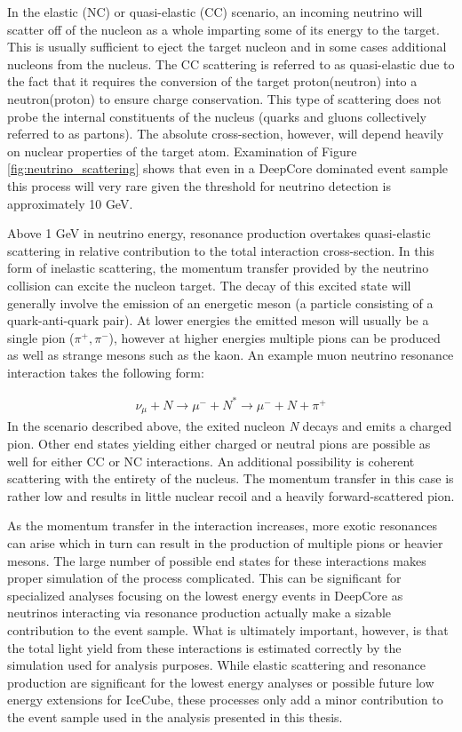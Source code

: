\documentclass{gatech-thesis}
\begin{document}
In the elastic (NC) or quasi-elastic (CC) scenario, an incoming neutrino will scatter off of the nucleon as a whole imparting some of its energy to the target. This is usually sufficient to eject the target nucleon and in some cases additional nucleons from the nucleus. The CC scattering is referred to as quasi-elastic due to the fact that it requires the conversion of the target proton(neutron) into a neutron(proton) to ensure charge conservation. This type of scattering does not probe the internal constituents of the nucleus (quarks and gluons collectively referred to as partons). The absolute cross-section, however, will depend heavily on nuclear properties of the target atom. Examination of Figure \ref{fig:neutrino_scattering} shows that even in a DeepCore dominated event sample this process will very rare given the threshold for neutrino detection is approximately 10 GeV.

Above 1 GeV in neutrino energy, resonance production overtakes quasi-elastic scattering in relative contribution to the total interaction cross-section. In this form of inelastic scattering, the momentum transfer provided by the neutrino collision can excite the nucleon target. The decay of this excited state will generally involve the emission of an energetic meson (a particle consisting of a quark-anti-quark pair). At lower energies the emitted meson will usually be a single pion ($\pi^{+},\pi^{-}$), however at higher energies multiple pions can be produced as well as strange mesons such as the kaon. An example muon neutrino resonance interaction takes the following form:

\begin{eqnarray}
\nu_{\mu} + N \rightarrow \mu^{-} + N^{*} \rightarrow \mu^{-} + N + \pi^{+}
\end{eqnarray}
In the scenario described above, the exited nucleon \textit{N} decays and emits a charged pion. Other end states yielding either charged or neutral pions are possible as well for either CC or NC interactions. An additional possibility is coherent scattering with the entirety of the nucleus. The momentum transfer in this case is rather low and results in little nuclear recoil and a heavily forward-scattered pion.

As the momentum transfer in the interaction increases, more exotic resonances can arise which in turn can result in the production of multiple pions or heavier mesons. The large number of possible end states for these interactions makes proper simulation of the process complicated. This can be significant for specialized analyses focusing on the lowest energy events in DeepCore as neutrinos interacting via resonance production actually make a sizable contribution to the event sample. What is ultimately important, however, is that the total light yield from these interactions is estimated correctly by the simulation used for analysis purposes. While elastic scattering and resonance production are significant for the lowest energy analyses or possible future low energy extensions for IceCube, these processes only add a minor contribution to the event sample used in the analysis presented in this thesis.
\end{document}
